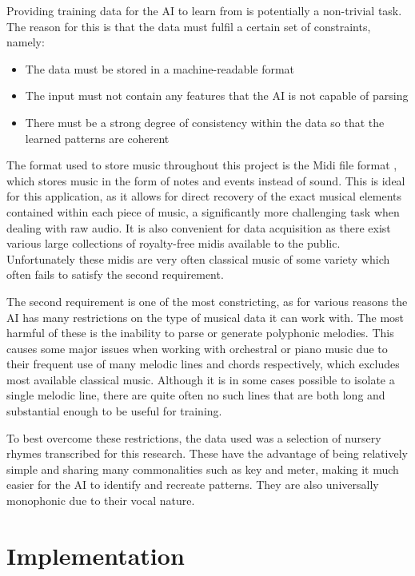 \documentclass[ author={Stephen Livermore-Tozer},
				supervisor={Dr. Peter Flach},
				degree={MEng},
				title={Performing Algorithmic Co-composition Using Machine Learning},
				subtitle={},
				type={research},
				year={2016} ]{dissertation}
\begin{document}
	Providing training data for the AI to learn from is potentially a non-trivial task. The reason for this is that the data must fulfil a certain set of constraints, namely:
	
	\begin{itemize}
		\item The data must be stored in a machine-readable format
		\item The input must not contain any features that the AI is not capable of parsing
		\item There must be a strong degree of consistency within the data so that the learned patterns are coherent
	\end{itemize}
	
	The format used to store music throughout this project is the Midi file format \cite{swift1997brief}, which stores music in the form of notes and events instead of sound. This is ideal for this application, as it allows for direct recovery of the exact musical elements contained within each piece of music, a significantly more challenging task when dealing with raw audio. It is also convenient for data acquisition as there exist various large collections of royalty-free midis available to the public. Unfortunately these midis are very often classical music of some variety which often fails to satisfy the second requirement.
	
	The second requirement is one of the most constricting, as for various reasons the AI has many restrictions on the type of musical data it can work with. %
	The most harmful of these is the inability to parse or generate polyphonic melodies. This causes some major issues when working with orchestral or piano music due to their frequent use of many melodic lines and chords respectively, which excludes most available classical music. Although it is in some cases possible to isolate a single melodic line, there are quite often no such lines that are both long and substantial enough to be useful for training.
	
	To best overcome these restrictions, the data used was a selection of nursery rhymes transcribed for this research. These have the advantage of being relatively simple and sharing many commonalities such as key and meter, making it much easier for the AI to identify and recreate patterns. They are also universally monophonic due to their vocal nature.
	
	\section{Implementation}
	
\end{document}
